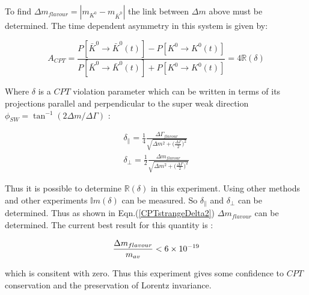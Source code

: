 To find ${\Delta m}_{flavour} = |m_{K^{0}} - m_{\bar{K}^{0}}|$ the link between $\Delta m$ above must be determined. The time dependent asymmetry in this system is given by:

\begin{equation*}
A_{CPT} = \frac{P[\bar{K}^{0} \rightarrow \bar{K}^{0}(t)] - P[{K}^{0} \rightarrow {K}^{0}(t)]}{P[\bar{K}^{0} \rightarrow \bar{K}^{0}(t)] + P[{K}^{0} \rightarrow {K}^{0}(t)]} = 4 \mathbb{R}({\delta})
\end{equation*}

\smallskip

\noindent Where $\delta$ is a $CPT$ violation parameter which can be written in terms of its projections parallel and perpendicular to the super weak direction $\phi_{SW} = \tan^{-1} (2 \Delta m / \Delta \Gamma)$ \cite{PDGKaons}:

\begin{align}
\label{CPTstrangeDelta1}
\delta_{\parallel} = \frac{1}{4} \frac{{\Delta \Gamma}_{flavour}}{\sqrt{\Delta m^{2} + \big(\frac{\Delta \Gamma}{2} \big)^{2}}} \\
\label{CPTstrangeDelta2}
\delta_{\perp} = \frac{1}{2} \frac{{\Delta m}_{flavour}}{\sqrt{\Delta m^{2} + \big(\frac{\Delta \Gamma}{2} \big)^{2}}}
\end{align}

Thus it is possible to determine $\mathbb{R}({\delta})$ in this experiment. Using other methods and other experiments $\mathbb{I}m({\delta})$ can be measured. So $\delta_{\parallel}$ and $\delta_{\perp}$ can be determined. Thus as shown in Eqn.(\ref{CPTstrangeDelta2}) $\Delta m_{flavour}$ can be determined. The current best result for this quantity is \cite{PDGKaons}: 

$$\frac{\Delta m_{flavour}}{m_{av}} < 6 \times 10^{-19}$$ 

\noindent which is consitent with zero. Thus this experiment gives some confidence to $CPT$ conservation and the preservation of Lorentz invariance.      
  
  
  
  
